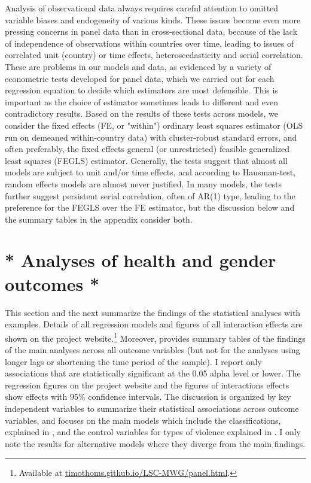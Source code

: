 \documentclass[12pt]{article}
\begin{document}
Analysis of observational data always requires careful attention to omitted variable biases and endogeneity of various kinds.
These issues become even more pressing concerns in panel data than in cross-sectional data, because of the lack of independence of observations within countries over time, leading to issues of correlated unit (country) or time effects, heteroscedasticity and serial correlation.
These are problems in our models and data, as evidenced by a variety of econometric tests developed for panel data, which we carried out for each regression equation to decide which estimators are most defensible.
This is important as the choice of estimator sometimes leads to different and even contradictory results.
Based on the results of these tests across models, we consider the fixed effects (FE, or "within") ordinary least squares estimator (OLS run on demeaned within-country data) with cluster-robust standard errors, and often preferably, the fixed effects general (or unrestricted) feasible generalized least squares (FEGLS) estimator.
Generally, the tests suggest that almost all models are subject to unit and/or time effects, and according to Hausman-test, random effects models are almost never justified. In many models, the tests further suggest persistent serial correlation, often of AR(1) type, leading to the preference for the FEGLS over the FE estimator, but the discussion below and the summary tables in the appendix consider both.

\section{* Analyses of health and gender outcomes *}
\label{results_hg}

This section and the next summarize the findings of the statistical analyses with examples. Details of all regression models and figures of all interaction effects are shown on the project website.\footnote{Available at \href{https://timothoms.github.io/LSC-MWG/panel.html}{timothoms.github.io/LSC-MWG/panel.html}.} Moreover,  provides summary tables of the  findings of the main analyses across all outcome variables (but not for the analyses using longer lags or shortening the time period of the sample).
I report only associations that are statistically significant at the 0.05 alpha level or lower. The regression figures on the project website and the figures of interactions effects show effects with 95\% confidence intervals.
The discussion is organized by key independent variables to summarize their statistical associations across outcome variables, and focuses on the main models which include the classifications, explained in , and the control variables for types of violence explained in . I only note the results for alternative models where they diverge from the main findings.
\end{document}
